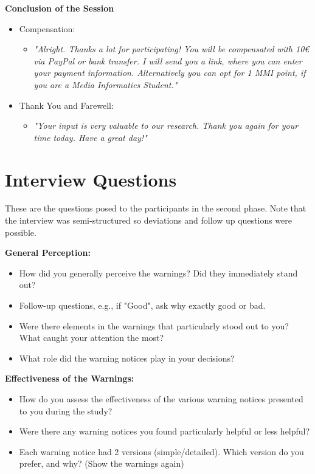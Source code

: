 \documentclass[
  a4paper,  %
  twoside,  %
  bibliography=totoc,
  headsepline,
  cleardoublepage=empty,
  parskip=half,
  draft=false
]{scrbook}
\begin{document}
\textbf{Conclusion of the Session}
\begin{itemize}
    \item Compensation: 
        \begin{itemize}
            \item[] \textit{"Alright. Thanks a lot for participating! You will be compensated with 10€ via PayPal or bank transfer. I will send you a link, where you can enter your payment information. Alternatively you can opt for 1 MMI point, if you are a Media Informatics Student."}
        \end{itemize}
    \item Thank You and Farewell: 
        \begin{itemize}
            \item[] \textit{"Your input is very valuable to our research. Thank you again for your time today. Have a great day!"}
        \end{itemize}
\end{itemize}

\section{Interview Questions}
\label{sec:interview}
These are the questions posed to the participants in the second phase. Note that the interview was semi-structured so deviations and follow up questions were possible.

\textbf{General Perception:}

\begin{itemize}
    \item How did you generally perceive the warnings? Did they immediately stand out?
    \item Follow-up questions, e.g., if "Good", ask why exactly good or bad.
    \item Were there elements in the warnings that particularly stood out to you? What caught your attention the most?
    \item What role did the warning notices play in your decisions?
\end{itemize}

\textbf{Effectiveness of the Warnings:
}
    \begin{itemize}
        \item How do you assess the effectiveness of the various warning notices presented to you during the study?
        \item Were there any warning notices you found particularly helpful or less helpful?
        \item Each warning notice had 2 versions (simple/detailed). Which version do you prefer, and why? (Show the warnings again)
    \end{itemize}
\end{document}

